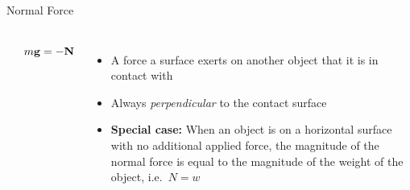\documentclass[12pt,compress,aspectratio=169]{beamer}
\newcommand{\mb}[1]{\ensuremath\mathbf{#1}}
\begin{document}
\begin{frame}{Normal Force}
  \begin{columns}
    \begin{center}
    \end{center}
    \begin{displaymath}
      m\mb{g}=-\mb{N}
    \end{displaymath}
    
    \begin{itemize}
    \item A force a surface exerts on another object that it is in contact with
    \item Always \emph{perpendicular} to the contact surface
    \item\textbf{Special case:} When an object is on a horizontal surface
      with no additional applied force, the magnitude of the normal force is
      equal to the magnitude of the weight of the object, i.e.\ $N=w$
    \end{itemize}
  \end{columns}
\end{frame}
\end{document}
